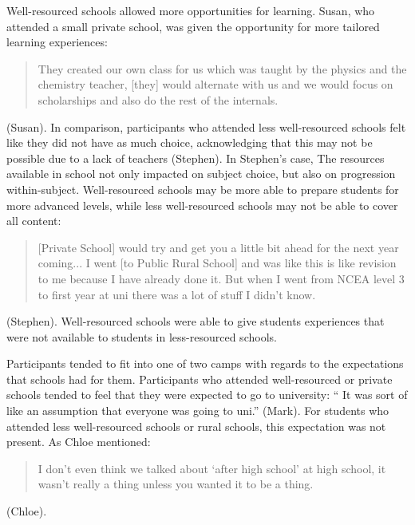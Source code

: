 \documentclass[a4paper,man,natbib]{apa6}
\begin{document}
Well-resourced schools allowed more opportunities for learning. Susan, who attended a small private school, was given the opportunity for more tailored learning experiences: \blockquote{They created our own class for us which was taught by the physics and the chemistry teacher, [they] would alternate with us and we would focus on scholarships and also do the rest of the internals.} (Susan). In comparison, participants who attended less well-resourced schools felt like they did not have as much choice, acknowledging that this may not be possible due to a lack of teachers (Stephen). In Stephen's case, The resources available in school not only impacted on subject choice, but also on progression within-subject. Well-resourced schools may be more able to prepare students for more advanced levels, while less well-resourced schools may not be able to cover all content: \blockquote{[Private School] would try and get you a little bit ahead for the next year coming... I went [to Public Rural School] and was like this is like revision to me because I have already done it. But when I went from NCEA level 3 to first year at uni there was a lot of stuff I didn't know.} (Stephen). Well-resourced schools were able to give students experiences that were not available to students in less-resourced schools. 

Participants tended to fit into one of two camps with regards to the expectations that schools had for them. Participants who attended well-resourced or private schools tended to feel that they were expected to go to university: `` It was sort of like an assumption that everyone was going to uni.'' (Mark). For students who attended less well-resourced schools or rural schools, this expectation was not present. As Chloe mentioned: \blockquote{I don't even think we talked about `after high school' at high school, it wasn't really a thing unless you wanted it to be a thing.} (Chloe). 

 
\end{document}
